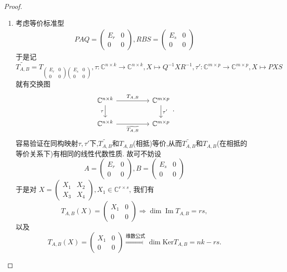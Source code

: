 \documentclass[../../main.tex]{subfiles}
\begin{document}
\begin{proof}
\begin{enumerate}
\item 考虑等价标准型
\begin{align}
PAQ = \begin{pmatrix} E_r & 0 \\ 0 & 0 \end{pmatrix}, RBS = \begin{pmatrix} E_s & 0 \\ 0 & 0 \end{pmatrix} \label{eq:1}
\end{align}
于是记
$$\widetilde{T_{A,B}} = T_{\begin{pmatrix} E_r & 0 \\ 0 & 0 \end{pmatrix} \begin{pmatrix} E_s & 0 \\ 0 & 0 \end{pmatrix}}, \tau : \mathbb{C}^{n \times k} \to \mathbb{C}^{n \times k}, X \mapsto Q^{-1}XR^{-1}, \tau' : \mathbb{C}^{m \times p} \to \mathbb{C}^{m \times p}, X \mapsto PXS$$
就有交换图
\[
\begin{tikzcd}
\mathbb{C}^{n\times k} \arrow[rr, "{T_{A,B}}"] \arrow[d, "\tau"'] &  & \mathbb{C}^{m\times p} \arrow[d, "\tau'"] \\
\mathbb{C}^{n\times k} \arrow[rr, "{\widetilde{T_{A,B}}}"']       &  & \mathbb{C}^{m\times p}                   
\end{tikzcd}.
\]
容易验证在同构映射$\tau ,\tau'$下,$\widetilde{T_{A,B}}$和$T_{A,B}$(相抵)等价,从而$\widetilde{T_{A,B}}$和$T_{A,B}$(在相抵的等价关系下)有相同的线性代数性质.
故可不妨设
$$A = \begin{pmatrix} E_r & 0 \\ 0 & 0 \end{pmatrix}, B = \begin{pmatrix} E_s & 0 \\ 0 & 0 \end{pmatrix}$$
于是对 $X = \begin{pmatrix} X_1 & X_2 \\ X_3 & X_4 \end{pmatrix}, X_1 \in \mathbb{C}^{r \times s}$, 我们有
$$T_{A,B}(X) = \begin{pmatrix} X_1 & 0 \\ 0 & 0 \end{pmatrix} \Rightarrow \dim \operatorname{Im} T_{A,B} = rs,$$
以及
$$T_{A,B}(X) = \begin{pmatrix} X_1 & 0 \\ 0 & 0 \end{pmatrix} \stackrel{\text{维数公式}}{\Rightarrow} \dim \mathrm{Ker} T_{A,B} = nk - rs.$$


\end{enumerate}
\end{proof}
\end{document}
